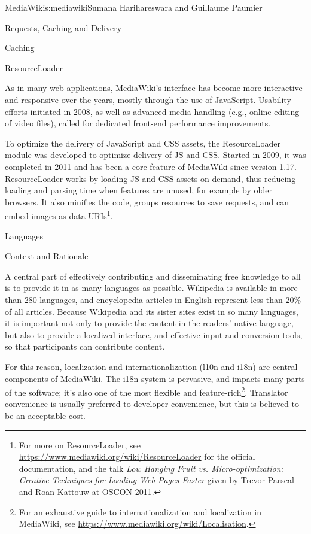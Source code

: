 \begin{aosachapter}{MediaWiki}{s:mediawiki}{Sumana Harihareswara and Guillaume Paumier}
\begin{aosasect1}{Requests, Caching and Delivery}
\begin{aosasect2}{Caching}
\end{aosasect2}

\begin{aosasect2}{ResourceLoader}

As in many web applications, MediaWiki's interface has become more
interactive and responsive over the years, mostly through the use of
JavaScript. Usability efforts initiated in 2008, as well as advanced
media handling (e.g., online editing of video files), called for
dedicated front-end performance improvements.

To optimize the delivery of JavaScript and CSS assets, the
ResourceLoader module was developed to optimize delivery of JS and
CSS. Started in 2009, it was completed in 2011 and has been a core
feature of MediaWiki since version 1.17. ResourceLoader works by
loading JS and CSS assets on demand, thus reducing loading and parsing
time when features are unused, for example by older browsers. It also
minifies the code, groups resources to save requests, and can embed
images as data URIs\footnote{For more on ResourceLoader, see
  \url{https://www.mediawiki.org/wiki/ResourceLoader} for the official
  documentation, and the talk \emph{Low Hanging Fruit
    vs. Micro-optimization: Creative Techniques for Loading Web Pages
    Faster} given by Trevor Parscal and Roan Kattouw at OSCON 2011.}.

\end{aosasect2}

\end{aosasect1}

\begin{aosasect1}{Languages}

\begin{aosasect2}{Context and Rationale}

A central part of effectively contributing and disseminating free
knowledge to all is to provide it in as many languages as
possible. Wikipedia is available in more than 280 languages, and
encyclopedia articles in English represent less than 20\% of all
articles. Because Wikipedia and its sister sites exist in so many
languages, it is important not only to provide the content in the
readers' native language, but also to provide a localized interface,
and effective input and conversion tools, so that participants can
contribute content.

For this reason, localization and internationalization (l10n and
i18n) are central components of MediaWiki. The i18n system is
pervasive, and impacts many parts of the software; it's also one of
the most flexible and feature-rich\footnote{For an exhaustive guide to
  internationalization and localization in MediaWiki, see
  \url{https://www.mediawiki.org/wiki/Localisation}.}. Translator
convenience is usually preferred to developer convenience, but this is
believed to be an acceptable cost.


\end{aosasect2}
\end{aosasect1}
\end{aosachapter}
